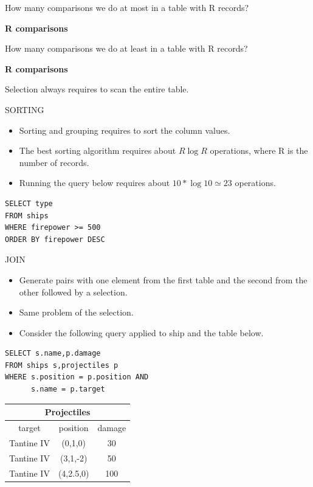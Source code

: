 \documentclass{beamer}
\begin{document}
\begin{slide}{
\item How many comparisons we do at most in a table with R records?
\pause
\item \textbf{R comparisons}
\pause
\item How many comparisons we do at least in a table with R records?
\pause
\item \textbf{R comparisons}
\pause
\item Selection always requires to scan the entire table.
}\end{slide}

\begin{frame}[fragile]{SORTING}
\begin{itemize}
\item Sorting and grouping requires to sort the column values.
\item The best sorting algorithm requires about $R\log R$ operations, where R is the number of records.
\item Running the query below requires about $10 * \log 10 \simeq 23$ operations.
\end{itemize}

\begin{lstlisting}
SELECT type
FROM ships
WHERE firepower >= 500
ORDER BY firepower DESC
\end{lstlisting}
\end{frame}

\begin{frame}[fragile]{JOIN}
\begin{itemize}
\item Generate pairs with one element from the first table and the second from the other followed by a selection.
\item Same problem of the selection.
\item Consider the following query applied to ship and the table below.
\end{itemize}

\begin{lstlisting}
SELECT s.name,p.damage
FROM ships s,projectiles p
WHERE s.position = p.position AND
      s.name = p.target
\end{lstlisting}




\tiny
\begin{tabular}{|c|c|c|}
\hline
\multicolumn{3}{|c|}{\textbf{Projectiles}} \\
\hline
target & position & damage \\
\hline
Tantine IV & (0,1,0) & 30 \\
\hline
Tantine IV & (3,1,-2) & 50 \\
\hline
Tantine IV & (4,2.5,0) & 100 \\
\hline
\end{tabular} 
\end{frame}
\end{document}

